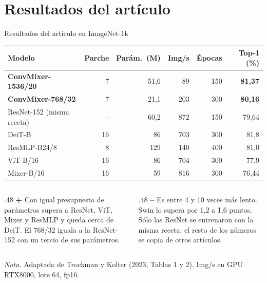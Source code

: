 \documentclass[aspectratio=169,xcolor=table]{beamer}
\newcommand{\fuente}[1]{\vfill{\fontsize{5.5}{6.5}\selectfont\color{gray}#1\par}}
\begin{document}
\section{Resultados del artículo}
\begin{frame}{Resultados del artículo en ImageNet-1k}
  \centering\small
  \begin{tabular}{lrrrrr}
    \toprule
    Modelo & Parche & Parám.\ (M) & Img/s & Épocas & Top-1 (\%)\\
    \midrule
    \rowcolor{unajgris}\textbf{ConvMixer-1536/20} & 7 & 51,6 & 89 & 150 & \textbf{81,37}\\
    \rowcolor{unajgris}\textbf{ConvMixer-768/32} & 7 & 21,1 & 203 & 300 & \textbf{80,16}\\
    ResNet-152 (misma receta) & -- & 60,2 & 872 & 150 & 79,64\\
    DeiT-B & 16 & 86 & 703 & 300 & 81,8\\
    ResMLP-B24/8 & 8 & 129 & 140 & 400 & 81,0\\
    ViT-B/16 & 16 & 86 & 704 & 300 & 77,9\\
    Mixer-B/16 & 16 & 59 & 816 & 300 & 76,44\\
    \bottomrule
  \end{tabular}
  \vspace{6pt}
  \begin{columns}[T]
    \begin{column}{.48\textwidth}\footnotesize
      \textbf{+} Con igual presupuesto de parámetros supera a ResNet, ViT, Mixer y ResMLP y queda cerca de DeiT.
      El 768/32 iguala a la ResNet-152 con un tercio de sus parámetros.
    \end{column}
    \begin{column}{.48\textwidth}\footnotesize
      \textbf{--} Es entre 4 y 10 veces más lento. Swin lo supera por 1,2 a 1,6 puntos. Sólo las ResNet se
      entrenaron con la misma receta; el resto de los números se copia de otros artículos.
    \end{column}
  \end{columns}
  \fuente{\textit{Nota.} Adaptado de Trockman y Kolter (2023, Tablas 1 y 2). Img/s en GPU RTX8000, lote 64, fp16.}
\end{frame}
\end{document}
